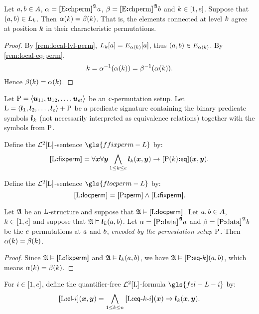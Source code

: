 \begin{remark}\label{rem:local-lvl-agree}
Let $a, b \in A$, $\alpha = {\bm{[}\mathrm{E}\mathord{\bm{:}}\mathrm{chperm}\bm{]}}^{\mathfrak{A}}a$,
$\beta = {\bm{[}\mathrm{E}\mathord{\bm{:}}\mathrm{chperm}\bm{]}}^{\mathfrak{A}}b$ and $k \in [1,e]$.
Suppose that $(a, b) \in L_{k}$.
Then $\alpha(k) = \beta(k)$.
That is, the elements connected at level $k$ agree at position $k$ in their
characteristic permutations.
\end{remark}
\begin{proof}
By \cref{rem:local-lvl-perm}, $L_{k}[a] = E_{\alpha(k)}[a]$, thus
$(a, b) \in E_{\alpha(k)}$. 
By \cref{rem:local-eq-perm},
\[
  k = \alpha^{-1}(\alpha(k)) = \beta^{-1}(\alpha(k)).
\]
Hence $\beta(k) = \alpha(k)$.
\end{proof}

Let $\mathrm{P} = \left\langle \bm{u}_{11}, \bm{u}_{12}, \dots, \bm{u}_{et} \right\rangle$ be an
$e$-permutation setup.
Let $\mathrm{L} = \left\langle \bm{l}_{1}, \bm{l}_{2}, \dots, \bm{l}_{e} \right\rangle + \mathrm{P}$ be a predicate
signature containing the binary predicate symbols $\bm{l}_{k}$ (not necessarily
interpreted as equivalence relations) together with the symbols from $\mathrm{P}$.
\begin{definition}
Define the $\mathcal{L}^{2}[\mathrm{L}]$-sentence $\gls{ffixperm-L}$ by:
\[
  {\bm{[}\mathrm{L}\mathord{\bm{:}}\mathsf{fixperm}\bm{]}} = \forall\bm{x} \forall\bm{y} \bigwedge_{1 \leq k \leq e}
  \bm{l}_{k}(\bm{x},\bm{y}) \rightarrow {\bm{[}\mathrm{P}(k)\mathord{\bm{:}}\mathsf{eq}\bm{]}}(\bm{x},\bm{y}).
\]
\end{definition}
\begin{definition}
Define the $\mathcal{L}^{2}[\mathrm{L}]$-sentence $\gls{flocperm-L}$ by:
\[
  {\bm{[}\mathrm{L}\mathord{\bm{:}}\mathsf{locperm}\bm{]}} = {\bm{[}\mathrm{P}\mathord{\bm{:}}\mathsf{perm}\bm{]}} \land {\bm{[}\mathrm{L}\mathord{\bm{:}}\mathsf{fixperm}\bm{]}}.
\]
\end{definition}
\begin{remark}\label{rem:local-perm-val-fixed}
Let $\mathfrak{A}$ be an $\mathrm{L}$-structure and suppose that $\mathfrak{A} \vDash {\bm{[}\mathrm{L}\mathord{\bm{:}}\mathsf{locperm}\bm{]}}$.
Let $a, b \in A$, $k \in [1,e]$ and suppose that
$\mathfrak{A} \vDash \bm{l}_{k}(a, b)$.
Let $\alpha = {\bm{[}\mathrm{P}\mathord{\bm{:}}\mathrm{data}\bm{]}}^{\mathfrak{A}}a$ and $\beta = {\bm{[}\mathrm{P}\mathord{\bm{:}}\mathrm{data}\bm{]}}^{\mathfrak{A}}b$ be the
$e$-permutations at $a$ and $b$,
\emph{encoded by the permutation setup $\mathrm{P}$}.
Then $\alpha(k) = \beta(k)$.
\end{remark}
\begin{proof}
Since $\mathfrak{A} \vDash {\bm{[}\mathrm{L}\mathord{\bm{:}}\mathsf{fixperm}\bm{]}}$ and $\mathfrak{A} \vDash \bm{l}_{k}(a,b)$, we have
$\mathfrak{A} \vDash {\bm{[}\mathrm{P}\mathord{\bm{:}}\mathsf{eq}{\hbox{-}}k\bm{]}}(a,b)$, which means $\alpha(k) = \beta(k)$.
\end{proof}

\begin{definition}
For $i \in [1,e]$, define the quantifier-free $\mathcal{L}^{2}[\mathrm{L}]$-formula
$\gls{fel-L-i}$ by:
\[
  {\bm{[}\mathrm{L}\mathord{\bm{:}}\mathsf{el}{\hbox{-}}i\bm{]}}(\bm{x},\bm{y}) = \bigwedge_{1 \leq k \leq n}
  {\bm{[}\mathrm{L}\mathord{\bm{:}}\mathsf{eq}{\hbox{-}}k{\hbox{-}}i\bm{]}}(\bm{x}) \rightarrow \bm{l}_{k}(\bm{x},\bm{y}).
\]
\end{definition}

